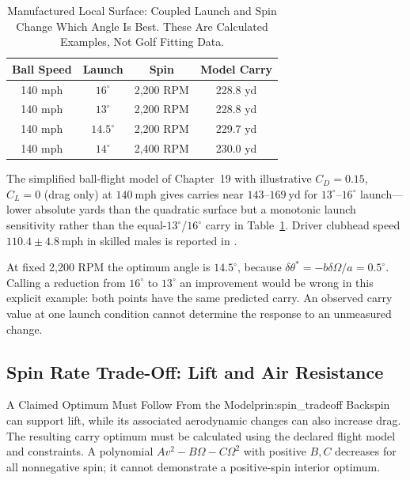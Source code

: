 \begin{table}[htbp]
\centering
\begin{tabular}{cccc}
\hline
\textbf{Ball Speed} & \textbf{Launch} & \textbf{Spin} & \textbf{Model Carry} \\
\hline
140 mph & $16^\circ$ & 2,200 RPM & 228.8 yd \\
140 mph & $13^\circ$ & 2,200 RPM & 228.8 yd \\
140 mph & $14.5^\circ$ & 2,200 RPM & 229.7 yd \\
140 mph & $14^\circ$ & 2,400 RPM & 230.0 yd \\
\hline
\end{tabular}
\caption{Manufactured Local Surface: Coupled Launch and Spin Change Which Angle Is Best. These Are Calculated Examples, Not Golf Fitting Data.}
\label{tab:launch_angle_opt}
\end{table}

The simplified ball-flight model of Chapter~19 with illustrative $C_D=0.15$, $C_L=0$ (drag only) at $140\ \mathrm{mph}$ gives carries near $143$--$169\ \mathrm{yd}$ for $13^\circ$--$16^\circ$ launch---lower absolute yards than the quadratic surface but a monotonic launch sensitivity rather than the equal-$13^\circ$/$16^\circ$ carry in Table~\ref{tab:launch_angle_opt}. Driver clubhead speed $110.4\pm4.8\ \mathrm{mph}$ in skilled males is reported in \citet{han2019}.

At fixed 2,200 RPM the optimum angle is $14.5^\circ$, because
$\delta\theta^*=-b\delta\Omega/a=0.5^\circ$. Calling a reduction from
$16^\circ$ to $13^\circ$ an improvement would be wrong in this explicit
example: both points have the same predicted carry. An observed carry value
at one launch condition cannot determine the response to an unmeasured change.

\subsection{Spin Rate Trade-Off: Lift and Air Resistance}

\begin{principle}{A Claimed Optimum Must Follow From the Model}{prin:spin_tradeoff}
Backspin can support lift, while its associated aerodynamic changes can also
increase drag. The resulting carry optimum must be calculated using the
declared flight model and constraints. A polynomial
$A v^2-B\Omega-C\Omega^2$ with positive $B,C$ decreases for all nonnegative
spin; it cannot demonstrate a positive-spin interior optimum.
\end{principle}


